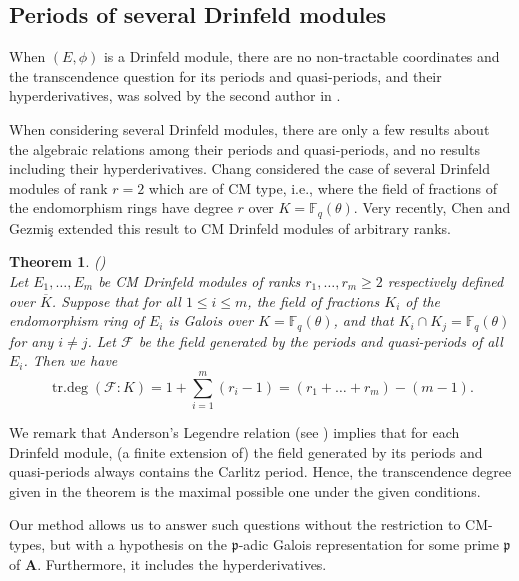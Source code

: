 \documentclass[10pt,a4paper]{amsart}
\theoremstyle{plain} %
\newtheorem{Theorem}{Theorem}[section]
\theoremstyle{definition}
\theoremstyle{remark}
\newcommand{\FF}{\mathbb{F}}
\newcommand{\fp}{\mathfrak{p}}  %
\newcommand{\bA}{\mathbf{A}}
\newcommand{\oK}{\overline{K}}
\newcommand{\Fq}{\FF_{\!q}}  %
\newcommand{\trdeg}{\operatorname{tr.deg}}
\numberwithin{equation}{subsection}
\begin{document}
\subsection{Periods of several Drinfeld modules}

When $(E, \phi)$ is a Drinfeld module, there are no non-tractable coordinates and the transcendence question for its periods and quasi-periods, and their hyperderivatives, was solved by the second author in \cite{cn:arhpldm}.

When considering several Drinfeld modules, there are only a few results about the algebraic relations among their periods and quasi-periods, and no results including their hyperderivatives.
Chang \cite{cc:svdmfai} considered the case of several Drinfeld modules of rank $r=2$ which are of CM type, i.e., where the field of fractions of the endomorphism rings have degree $r$ over $K=\Fq(\theta)$. Very recently, Chen and Gezmiş \cite{yc-og:svmdmfarcmp} extended this result to CM Drinfeld modules of arbitrary ranks.

\begin{Theorem} (\cite[Theorem 1.3.1]{yc-og:svmdmfarcmp})\\
Let $E_1,\ldots, E_m$ be CM Drinfeld modules of ranks $r_1,\ldots, r_m\geq 2$ respectively defined over $\oK$. Suppose that for all $1\leq i\leq m$, the field of fractions $K_i$ of the endomorphism ring of $E_i$ is Galois over $K=\Fq(\theta)$, and that $K_i\cap K_j=\Fq(\theta)$ for any $i \ne j$. Let $\mathcal{F}$ be the field generated by the periods and quasi-periods of all $E_i$. Then we have
\[ \trdeg(\mathcal{F}:K) = 1+\sum_{i=1}^m (r_i-1)= (r_1 + \dots + r_m ) - (m - 1). \]
\end{Theorem} 

We remark that Anderson's Legendre relation (see \cite[\S8.1]{og-mp:tdrifdmota})
implies that for each Drinfeld module, (a finite extension of) the field generated by its periods and quasi-periods always contains the Carlitz period. Hence, the transcendence degree given in the theorem is the maximal possible one under the given conditions.

\medskip

Our method allows us to answer such questions without the restriction to CM-types, but with a hypothesis on the $\fp$-adic Galois representation for some prime $\fp$ of $\bA$.
Furthermore, it includes the hyperderivatives.
\end{document}
